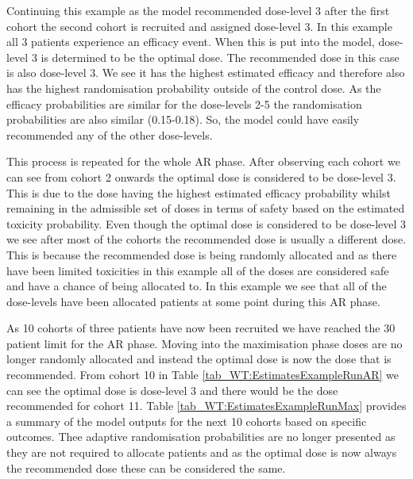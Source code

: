 Continuing this example as the model recommended dose-level 3 after the first cohort the second cohort is recruited and assigned dose-level 3. In this example all 3 patients experience an efficacy event. When this is put into the model, dose-level 3 is determined to be the optimal dose. The recommended dose in this case is also dose-level 3. We see it has the highest estimated efficacy and therefore also has the highest randomisation probability outside of the control dose. As the efficacy probabilities are similar for the dose-levels 2-5 the randomisation probabilities are also similar (0.15-0.18). So, the model could have easily recommended any of the other dose-levels. 

This process is repeated for the whole AR phase. After observing each cohort we can see from cohort 2 onwards the optimal dose is considered to be dose-level 3. This is due to the dose having the highest estimated efficacy probability whilst remaining in the admissible set of doses in terms of safety based on the estimated toxicity probability. Even though the optimal dose is considered to be dose-level 3 we see after most of the cohorts the recommended dose is usually a different dose. This is because the recommended dose is being randomly allocated and as there have been limited toxicities in this example all of the doses are considered safe and have a chance of being allocated to. In this example we see that all of the dose-levels have been allocated patients at some point during this AR phase. 

As 10 cohorts of three patients have now been recruited we have reached the 30 patient limit for the AR phase. Moving into the maximisation phase doses are no longer randomly allocated and instead the optimal dose is now the dose that is recommended. From cohort 10 in Table \ref{tab_WT:EstimatesExampleRunAR} we can see the optimal dose is dose-level 3 and there would be the dose recommended for cohort 11. Table \ref{tab_WT:EstimatesExampleRunMax} provides a summary of the model outputs for the next 10 cohorts based on specific outcomes. Thee adaptive randomisation probabilities are no longer presented as they are not required to allocate patients and as the optimal dose is now always the recommended dose these can be considered the same. 

